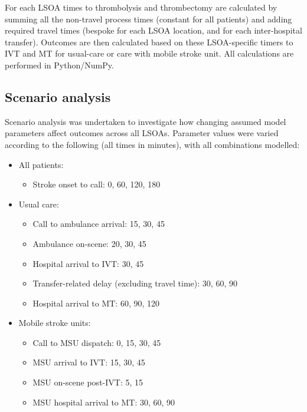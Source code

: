 For each LSOA times to thrombolysis and thrombectomy are calculated by summing all the non-travel process times (constant for all patients) and adding required travel times (bespoke for each LSOA location, and for each inter-hospital transfer). Outcomes are then calculated based on these LSOA-specific timers to IVT and MT for usual-care or care with mobile stroke unit. All calculations are performed in Python/NumPy.


\subsection{Scenario analysis}

Scenario analysis was undertaken to investigate how changing assumed model parameters affect outcomes across all LSOAs. Parameter values were varied according to the following (all times in minutes), with all combinations modelled:

\begin{minipage}{1.0\textwidth}  %
\begin{spacing}{1.2}
\begin{itemize}
    \item All patients:
    \begin{itemize}
        \item Stroke onset to call: 0, 60, 120, 180
    \end{itemize}
    \item Usual care:
    \begin{itemize}
        \item Call to ambulance arrival: 15, 30, 45
        \item Ambulance on-scene: 20, 30, 45
        \item Hospital arrival to IVT: 30, 45
        \item Transfer-related delay (excluding travel time): 30, 60, 90
        \item Hospital arrival to MT: 60, 90, 120
    \end{itemize}
    \item Mobile stroke units:
    \begin{itemize}
        \item Call to MSU dispatch: 0, 15, 30, 45
        \item MSU arrival to IVT: 15, 30, 45
        \item MSU on-scene post-IVT: 5, 15
        \item MSU hospital arrival to MT: 30, 60, 90
    \end{itemize}
\end{itemize}
\end{spacing}
\end{minipage}


